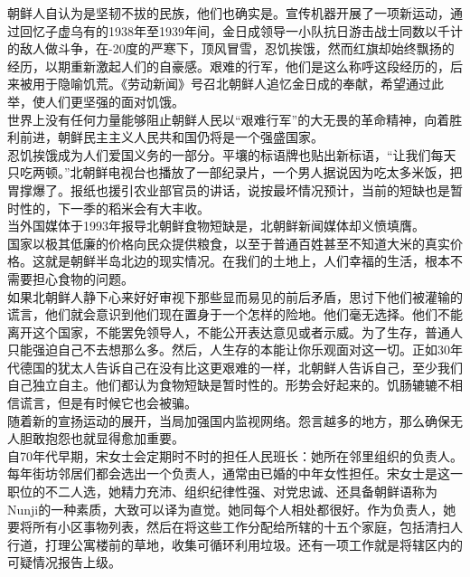 \begin{multicols}{\theparacolNo}
朝鲜人自认为是坚韧不拔的民族，他们也确实是。宣传机器开展了一项新运动，通过回忆子虚乌有的1938年至1939年间，金日成领导一小队抗日游击战士同数以千计的敌人做斗争，在-20度的严寒下，顶风冒雪，忍饥挨饿，然而红旗却始终飘扬的经历，以期重新激起人们的自豪感。艰难的行军，他们是这么称呼这段经历的，后来被用于隐喻饥荒。《劳动新闻》号召北朝鲜人追忆金日成的奉献，希望通过此举，使人们更坚强的面对饥饿。\\

世界上没有任何力量能够阻止朝鲜人民以“艰难行军”的大无畏的革命精神，向着胜利前进，朝鲜民主主义人民共和国仍将是一个强盛国家。\\

忍饥挨饿成为人们爱国义务的一部分。平壤的标语牌也贴出新标语，“让我们每天只吃两顿。”北朝鲜电视台也播放了一部纪录片，一个男人据说因为吃太多米饭，把胃撑爆了。报纸也援引农业部官员的讲话，说按最坏情况预计，当前的短缺也是暂时性的，下一季的稻米会有大丰收。\\

当外国媒体于1993年报导北朝鲜食物短缺是，北朝鲜新闻媒体却义愤填膺。\\

国家以极其低廉的价格向民众提供粮食，以至于普通百姓甚至不知道大米的真实价格。这就是朝鲜半岛北边的现实情况。在我们的土地上，人们幸福的生活，根本不需要担心食物的问题。\\

如果北朝鲜人静下心来好好审视下那些显而易见的前后矛盾，思讨下他们被灌输的谎言，他们就会意识到他们现在置身于一个怎样的险地。他们毫无选择。他们不能离开这个国家，不能罢免领导人，不能公开表达意见或者示威。为了生存，普通人只能强迫自己不去想那么多。然后，人生存的本能让你乐观面对这一切。正如30年代德国的犹太人告诉自己在没有比这更艰难的一样，北朝鲜人告诉自己，至少我们自己独立自主。他们都认为食物短缺是暂时性的。形势会好起来的。饥肠辘辘不相信谎言，但是有时候它也会被骗。\\

随着新的宣扬运动的展开，当局加强国内监视网络。怨言越多的地方，那么确保无人胆敢抱怨也就显得愈加重要。\\

自70年代早期，宋女士会定期时不时的担任人民班长：她所在邻里组织的负责人。每年街坊邻居们都会选出一个负责人，通常由已婚的中年女性担任。宋女士是这一职位的不二人选，她精力充沛、组织纪律性强、对党忠诚、还具备朝鲜语称为Nunji的一种素质，大致可以译为直觉。她同每个人相处都很好。作为负责人，她要将所有小区事物列表，然后在将这些工作分配给所辖的十五个家庭，包括清扫人行道，打理公寓楼前的草地，收集可循环利用垃圾。还有一项工作就是将辖区内的可疑情况报告上级。\\


\end{multicols}
